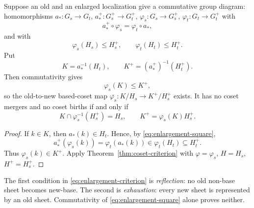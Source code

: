 \begin{corollary}\label{cor:enlarged-fiber}
Suppose an old and an enlarged localization give a commutative group diagram: homomorphisms
\( a_*\colon G_s\to G_t \), \( a_*^+\colon G_s^+\to G_t^+ \),
\( \varphi_s\colon G_s\to G_s^+ \), \( \varphi_t\colon G_t\to G_t^+ \) with
\begin{equation}\label{eq:enlargement-square}
  a_*^+\circ\varphi_s=\varphi_t\circ a_* ,
\end{equation}
and with
\[
  \varphi_s(H_s)\leq H_s^+,\qquad \varphi_t(H_t)\leq H_t^+ .
\]
Put
\[
  K=a_*^{-1}(H_t),\qquad K^+=(a_*^+)^{-1}(H_t^+).
\]
Then commutativity gives
\[
  \varphi_s(K)\leq K^+,
\]
so the old-to-new based-coset map \( \overline{\varphi_s}\colon K/H_s\to K^+/H_s^+ \) exists.  It has no coset mergers and no coset births if and only if
\begin{equation}\label{eq:enlargement-criterion}
  K\cap\varphi_s^{-1}(H_s^+)=H_s,
  \qquad
  K^+=\varphi_s(K)H_s^+ .
\end{equation}
\end{corollary}

\begin{proof}
If \( k\in K \), then \( a_*(k)\in H_t \).  Hence, by \eqref{eq:enlargement-square},
\[
  a_*^+(\varphi_s(k))=\varphi_t(a_*(k))\in\varphi_t(H_t)\subseteq H_t^+ .
\]
Thus \( \varphi_s(k)\in K^+ \).  Apply Theorem~\ref{thm:coset-criterion} with \( \varphi=\varphi_s \), \( H=H_s \), \( H^+=H_s^+ \).
\end{proof}

\begin{remark}\label{rem:reflection-exhaustion}
The first condition in \eqref{eq:enlargement-criterion} is \emph{reflection}: no old non-base sheet becomes new-base.  The second is \emph{exhaustion}: every new sheet is represented by an old sheet.  Commutativity of \eqref{eq:enlargement-square} alone proves neither.
\end{remark}